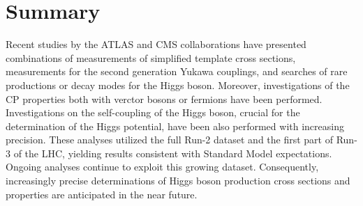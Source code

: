 \documentclass[a4paper,11pt]{article}
\begin{document}
\section{Summary}

Recent studies by the ATLAS and CMS collaborations have presented
combinations of measurements of simplified template cross sections,
measurements for the second generation Yukawa couplings, and searches
of rare productions or decay modes for the Higgs boson.  Moreover,
investigations of the CP properties both with verctor bosons or
fermions have been performed. Investigations on the self-coupling of
the Higgs boson, crucial for the determination of the Higgs potential,
have been also performed with increasing precision. These analyses
utilized the full Run-2 dataset and the first part of Run-3 of the
LHC, yielding results consistent with Standard Model expectations.
Ongoing analyses continue to exploit this growing
dataset. Consequently, increasingly precise determinations of Higgs
boson production cross sections and properties are anticipated in the
near future.



\end{document}
